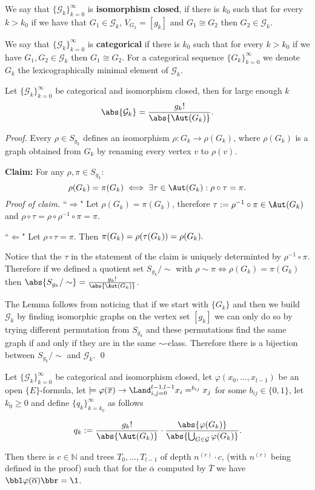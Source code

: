 \begin{defi}
We say that $\{\mathcal{G}_k\}_{k=0}^\infty$ is \textbf{isomorphism closed}, if there is $k_0$ such that for every $k>k_0$ if we have that $G_1\in\mathcal{G}_k$, $V_{G_2}=[g_k]$ and $G_1\cong G_2$ then $G_2\in\mathcal{G}_k$.

We say that $\{\mathcal{G}_k\}_{k=0}^\infty$ is \textbf{categorical} if there is $k_0$ such that for every $k>k_0$ if we have $G_1,G_2\in\mathcal{G}_k$ then $G_1\cong G_2$. For a categorical sequence $\{G_k\}_{k=0}^\infty$ we denote $G_k$ the lexicographically minimal element of $\mathcal{G}_k$.
\end{defi}

\begin{lemm}
Let $\{\mathcal{G}_k\}_{k=0}^\infty$ be categorical and isomorphism closed, then for large enough $k$
\[\abs{\mathcal{G}_k}=\frac{g_k!}{\abs{\Aut(G_k)}}.\]
\end{lemm}
\begin{proof}
Every $\rho\in S_{g_k}$ defines an isomorphism $\rho:G_k\to\rho(G_k)$, where $\rho(G_k)$ is a graph obtained from $G_k$ by renaming every vertex $v$ to $\rho(v)$.

\textbf{Claim:} For any $\rho,\pi\in S_{g_k}$:
\[\rho(G_k)=\pi(G_k)\iff\exists \tau\in\Aut(G_k):\rho\circ\tau=\pi.\]
\textit{Proof of claim.} ``$\Rightarrow$" Let $\rho(G_k)=\pi(G_k)$, therefore $\tau:=\rho^{-1}\circ\pi\in\Aut(G_k)$ and $\rho\circ\tau=\rho\circ\rho^{-1}\circ\pi=\pi.$

``$\Leftarrow$" Let $\rho\circ\tau=\pi$. Then $\pi(G_k)=\rho(\tau(G_k))=\rho(G_k). \qedhere$

Notice that the $\tau$ in the statement of the claim is uniquely determinted by $\rho^{-1}\circ\pi$. Therefore if we defined a quotient set $S_{g_k}/\sim$ with $\rho\sim\pi\iff\rho(G_k)=\pi(G_k)$ then $\abs{S_{g_k}/\sim}=\frac{g_k!}{\abs{\Aut(G_k)}}$.

The Lemma follows from noticing that if we start with $\{G_k\}$ and then we build $\mathcal{G}_k$ by finding isomorphic graphs on the vertex set $[g_k]$ we can only do so by trying different permutation from $S_{g_k}$ and these permutations find the same graph if and only if they are in the same $\sim$-class. Therefore there is a bijection between $S_{g_k}/\sim$ and $\mathcal{G}_k$. \qed
\end{proof}

\begin{lemm}
Let $\{\mathcal{G}_k\}_{k=0}^\infty$ be categorical and isomorphism closed, let $\varphi(x_0,\dots,x_{l-1})$ be an open $\{E\}$-formula, let $\models \varphi(\overline x) \to \Land_{i,j=0}^{l-1,l-1}x_i=^{b_{ij}}x_j$ for some $b_{ij}\in\{0,1\}$, let $k_0\geq0$ and define $\{q_k\}_{k=k_0}^\infty$ as follows

\[q_k:=\frac{g_k!}{\abs{\Aut(G_k)}}\cdot\frac{\abs{\varphi(G_k)}}{\abs{\bigcup_{G\in\mathcal{G}}\varphi(G_k)}}.\]

Then there is $c\in\mathbb{N}$ and trees $T_0,\dots,T_{l-1}$ of depth $n^{(r)} \cdot c$, (with $n^{(r)}$ being defined in the proof) such that for the $\overline \alpha$ computed by $\overline T$ we have $\bbl\varphi(\overline \alpha)\bbr=\1$.
\end{lemm}

